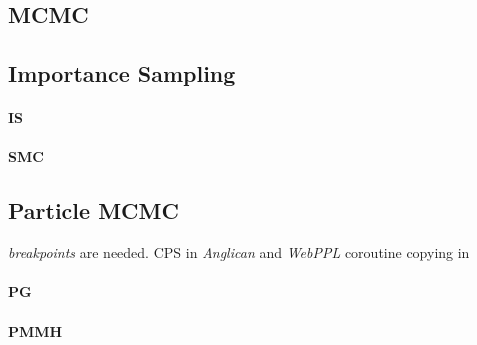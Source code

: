 \subsection{MCMC}
\cite{Wingate:2011ul}
\cite{Ritchie:2015tx}

\subsection{Importance Sampling}
\paragraph{IS}


\paragraph{SMC}


\subsection{Particle MCMC}
\textit{breakpoints} are needed. \gls{CPS} in \emph{Anglican} \cite{wood-aistats-2014} and \emph{WebPPL} \cite{dippl}
coroutine copying in \cite{Turing}

\paragraph{PG}


\paragraph{PMMH}


